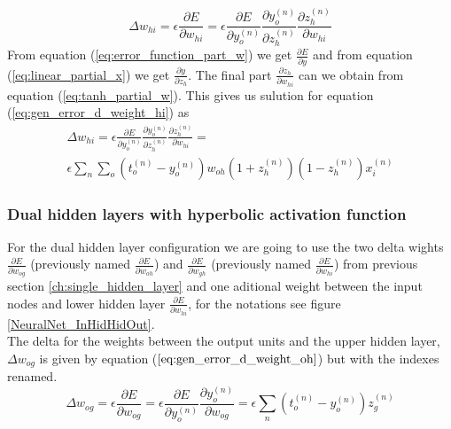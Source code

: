 \begin{equation} \label{eq:gen_error_d_weight_hi}
\Delta w_{hi} = \epsilon \frac{\partial{E}}{\partial{w_{hi}}} = \epsilon \frac{\partial{E}}{\partial{y^{(n)}_{o}}} \frac{\partial{y^{(n)}_{o}}}{\partial{z^{(n)}_{h}}} \frac{\partial{z^{(n)}_{h}}}{\partial{w_{hi}}}
\end{equation}
From equation (\ref{eq:error_function_part_w}) we get $\frac{\partial{E}}{\partial{y}}$
and from equation (\ref{eq:linear_partial_x}) we get $\frac{\partial{y}}{\partial{z_{h}}}$.
The final part $\frac{\partial{z_{h}}}{\partial{w_{hi}}}$ can we obtain from equation (\ref{eq:tanh_partial_w}). This gives us sulution for equation (\ref{eq:gen_error_d_weight_hi}) as
\begin{multline} \label{eq:gen_error_d_weight_hi_final}
\Delta w_{hi}  = \epsilon \frac{\partial{E}}{\partial{y^{(n)}_{o}}} \frac{\partial{y^{(n)}_{o}}}{\partial{z^{(n)}_{h}}} \frac{\partial{z^{(n)}_{h}}}{\partial{w_{hi}}} = \\
\epsilon \sum_{n} \sum_{o}(t^{(n)}_{o}-y^{(n)}_{o}) w_{oh} (1+z^{(n)}_{h})(1-z^{(n)}_{h}) x^{(n)}_{i}
\end{multline}




\subsubsection{Dual hidden layers with hyperbolic activation function} \label{ch:dual_hidden_layer}
For the dual hidden layer configuration we are going to use the two delta wights $\frac{\partial{E}}{\partial{w_{og}}}$ (previously named $\frac{\partial{E}}{\partial{w_{oh}}}$) and $\frac{\partial{E}}{\partial{w_{gh}}}$ (previously named $\frac{\partial{E}}{\partial{w_{hi}}}$) from previous section \ref{ch:single_hidden_layer} and one aditional weight between the input nodes and lower hidden layer $\frac{\partial{E}}{\partial{w_{hi}}}$, for the notations see figure \ref{NeuralNet_InHidHidOut}.
\\
The delta for the weights between the output units and the upper hidden layer, $\Delta w_{og}$ is given by equation ($\ref{eq:gen_error_d_weight_oh}$) but with the indexes renamed. 
\begin{equation} \label{eq:gen_dual_error_d_weight_og}
\Delta w_{og} = 
\epsilon \frac{\partial{E}}{\partial{w_{og}}} = 
\epsilon \frac{\partial{E}}{\partial{y^{(n)}_{o}}} \frac{\partial{y^{(n)}_{o}}}{\partial{w_{og}}} = 
\epsilon \sum_{n} (t^{(n)}_{o}-y^{(n)}_{o}) z^{(n)}_{g}
\end{equation}


